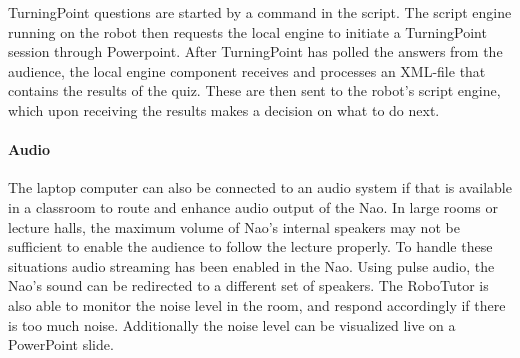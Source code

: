 TurningPoint questions are started by a command in the script. The script engine running on the robot then requests the local engine to initiate a TurningPoint session through Powerpoint. After TurningPoint has polled the answers from the audience, the local engine component receives and processes an XML-file that contains the results of the quiz. These are then sent to the robot's script engine, which upon receiving the results makes a decision on what to do next.

%
\paragraph{Audio} The laptop computer can also be connected to an audio system if that is available in a classroom to route and enhance audio output of the Nao. In large rooms or lecture halls, the maximum volume of Nao's internal speakers may not be sufficient to enable the audience to follow the lecture properly. To handle these situations audio streaming has been enabled in the Nao. Using pulse audio, the Nao's sound can be redirected to a different set of speakers. 
The RoboTutor is also able to monitor the noise level in the room, and respond accordingly if there is too much noise. Additionally the noise level can be visualized live on a PowerPoint slide.
